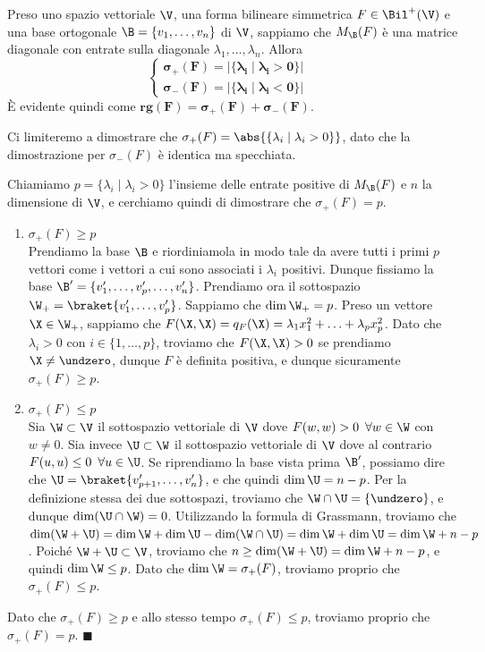 \documentclass[11pt, a4paper, titlepage, oneside]{scrbook}
\begin{document}
\begin{Proposizione}[]
\label{propos-calcolare-segnatura}
Preso uno spazio vettoriale $\V$, una forma bilineare simmetrica $F \in \Bil^+(\V)$ e una base ortogonale $\B = \{v_1, \ldots, v_n\}$ di $\V$, sappiamo che $M_\B(F)$ è una matrice diagonale con entrate sulla diagonale $\lambda_1, \ldots, \lambda_n$. Allora
\[
\begin{cases}
\bm{\sigma_+(F) = \left|\{\lambda_i \mid \lambda_i > 0\}\right|} & \\
\bm{\sigma_-(F) = \left|\{\lambda_i \mid \lambda_i < 0\}\right|} &
\end{cases}
\]
È evidente quindi come $\bm{rg(F) = \sigma_+(F) + \sigma_-(F)}$.
\end{Proposizione}

\Dimostrazione \nopagebreak

Ci limiteremo a dimostrare che $\sigma_+(F) = \abs{\{\lambda_i \mid \lambda_i > 0\}}$, dato che la dimostrazione per $\sigma_-(F)$ è identica ma specchiata.

Chiamiamo $p = \{\lambda_i \mid \lambda_i > 0\}$ l'insieme delle entrate positive di $M_\B(F)$ e $n$ la dimensione di $\V$, e cerchiamo quindi di dimostrare che $\sigma_+(F) = p$.
\begin{enumerate}[label=\arabic*°]
    \item $\sigma_+(F) \geq p$ \\
    Prendiamo la base $\B$ e riordiniamola in modo tale da avere tutti i primi $p$ vettori come i vettori a cui sono associati i $\lambda_i$ positivi. Dunque fissiamo la base $\B' = \{v_1', \ldots, v_p', \ldots, v_n'\}$. Prendiamo ora il sottospazio $\W_+ = \braket{v_1',\ldots,v_p'}$. Sappiamo che $\dim \W_+ = p$. Preso un vettore $\X \in \W_+$, sappiamo che $F(\X,\X) = q_F(\X) = \lambda_1 x_1^2 + \ldots + \lambda_p x_p^2$. Dato che $\lambda_i > 0$ con $i \in \{1, \ldots, p\}$, troviamo che $F(\X, \X) > 0$ se prendiamo $\X \neq \undzero$, dunque $F$ è definita positiva, e dunque sicuramente $\sigma_+(F) \geq p$.
    \item $\sigma_+(F) \leq p$ \\
    Sia $\W \subset \V$ il sottospazio vettoriale di $\V$ dove $F(w,w) > 0 \enspace \forall w \in \W$ con $w \neq 0$. Sia invece $\U \subset \W$ il sottospazio vettoriale di $\V$ dove al contrario $F(u,u) \leq 0 \enspace \forall u \in \U$. Se riprendiamo la base vista prima $\B'$, possiamo dire che $\U = \braket{v_{p+1}', \ldots, v_n'}$, e che quindi $\dim \U = n - p$. Per la definizione stessa dei due sottospazi, troviamo che $\W \cap \U = \{\undzero\}$, e dunque $\dim (\U \cap \W) = 0$. Utilizzando la formula di Grassmann, troviamo che \mbox{$\dim (\W + \U) = \dim \W + \dim \U - \dim (\W \cap \U) = \dim \W + \dim \U = \dim \W + n - p$}. Poiché $\W + \U \subset \V$, troviamo che \mbox{$n \geq \dim(\W + \U) = \dim \W + n - p$}, e quindi $\dim \W \leq p$. Dato che $\dim \W = \sigma_+(F)$, troviamo proprio che $\sigma_+(F) \leq p$.    
\end{enumerate}
Dato che $\sigma_+(F) \geq p$ e allo stesso tempo $\sigma_+(F) \leq p$, troviamo proprio che $\sigma_+(F) = p$. $\blacksquare$
\end{document}
